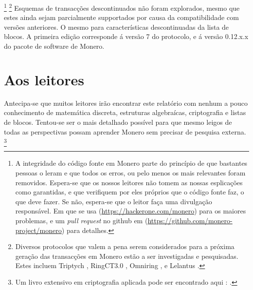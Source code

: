 \footnote{A integridade do código fonte em Monero parte do princípio de que bastantes pessoas o leram e que todos os erros, ou pelo menos os mais relevantes foram removidos.
Espera-se que os nossos leitores não tomem as nossas esplicações como garantidas, e que verifiquem por eles próprios que o código fonte faz, o que deve fazer. Se não, espera-se que o leitor faça uma divulgação responsável. Em que se usa (\url{https://hackerone.com/monero}) para os maiores problemas, e um {\em pull request} no github em (\url{https://github.com/monero-project/monero}) para detalhes.}    
\footnote{Diversos protocolos que valem a pena serem considerados para a próxima geração das transacções em Monero estão a ser investigadas e pesquisadas. Estes incluem Triptych \cite{triptych-preprint}, RingCT3.0 \cite{ringct3-preprint}, Omniring \cite{omniring-paper}, e Lelantus \cite{lelantus-preprint}.}  
Esquemas de transacções descontinuados não foram explorados, mesmo que estes ainda sejam parcialmente supportados por causa da compatibilidade com versões anteriores. O mesmo para características descontinuadas da lista de blocos. A primeira edição \cite{ztm-1} corresponde á versão 7 do protocolo, e á versão 0.12.x.x do pacote de software de Monero.
  
\section{Aos leitores}

Antecipa-se que muitos leitores irão encontrar este relatório com nenhum a pouco conhecimento de matemática discreta, estruturas algebraícas, criptografia e listas de blocos. Tentou-se ser o mais detalhado possível para que mesmo leigos de todas as perspectivas possam aprender Monero sem precisar de pesquisa externa.   
\footnote{Um livro extensivo em criptografia aplicada pode ser encontrado aqui :
\cite{applied-cryptography-textbook}.}

